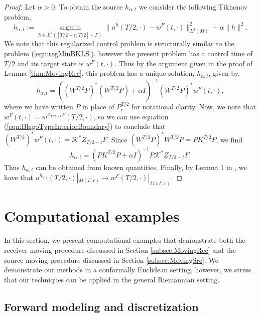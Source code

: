 \documentclass[final,leqno]{siamart1116}
\begin{document}
\begin{proof}
Let $\alpha > 0$. To obtain the source $h_{\alpha,t}$ we consider the
following Tikhonov problem,
\begin{equation}
  h_{\alpha,t} := \operatorname*{argmin}_{h \in L^2([T/2-r,T/2] \times \Gamma)} \|u^h(T/2,\cdot) - w^F(t,\cdot) \|_{L^2(M)}^2 + \alpha \|h\|^2.
\end{equation}
We note that this regularized control problem is structurally similar
to the problem (\ref{eqn:regMinBKLS}), however the present problem has
a control time of $T/2$ and its target state is $w^F(t,\cdot)$. Thus
by the argument given in the proof of Lemma \ref{thm:MovingRec}, this
problem has a unique solution, $h_{\alpha,t}$, given by,
\begin{equation}
  h_{\alpha,t} = ((W^{T/2}P)^*(W^{T/2}P) + \alpha I)^{-1} (W^{T/2}
  P)^* w^F(t,\cdot),
\end{equation}
where we have written $P$ in place of $P_r^{T/2}$ for notational
clarity. Now, we note that $w^F(t,\cdot) = w^{Z_{T/2 -
    t}F}(T/2,\cdot)$, so we can use equation
(\ref{eqn:BlagoTypeInteriorBoundary}) to conclude that
$(W^{T/2})^*w^F(t,\cdot) = {\mathcal{K}}^* Z_{T/2 - t}F$. Since
$(W^{T/2}P)^*W^{T/2}P = PK^{T/2}P$, we find
\begin{equation}
  \label{eqn:IntSrcControl}
  h_{\alpha,t} = (P K^{T/2} P + \alpha I)^{-1} P{\mathcal{K}}^*Z_{T/2 - t}F.
\end{equation}
Thus $h_{\alpha,t}$ can be obtained from known quantities. Finally, by
Lemma 1 in \cite{Oksanen2013}, we have that
$u^{h_{\alpha,t}}(T/2,\cdot)|_{M(\Gamma,r)} \rightarrow
w^F(T/2,\cdot)|_{M(\Gamma,r)}$. \quad
\end{proof}

\section{Computational examples}
\label{sec_comp}

In this section, we present computational examples that demonstrate
both the receiver moving procedure discussed in Section
\ref{subsec:MovingRec} and the source moving procedure discussed in
Section \ref{subsec:MovingSrc}. We demonstrate our methods in a
conformally Euclidean setting, however, we stress that our techniques
can be applied in the general Riemannian setting.

\subsection{Forward modeling and discretization}
\end{document}
